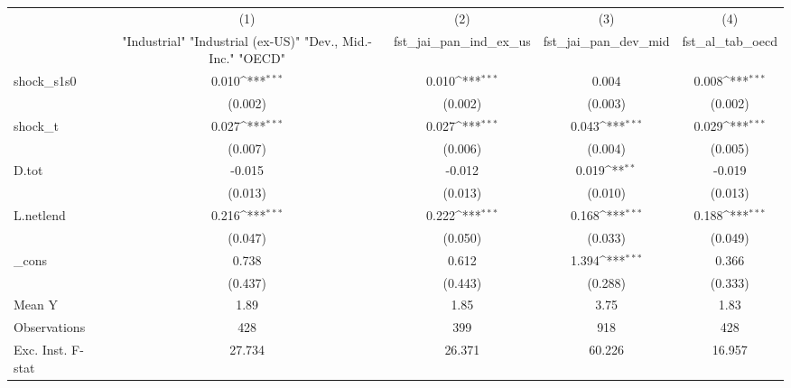 {
\def\sym#1{\ifmmode^{#1}\else\(^{#1}\)\fi}
\begin{tabular}{l*{4}{c}}
\toprule
            &\multicolumn{1}{c}{(1)}&\multicolumn{1}{c}{(2)}&\multicolumn{1}{c}{(3)}&\multicolumn{1}{c}{(4)}\\
            &\multicolumn{1}{c}{ "Industrial" "Industrial (ex-US)" "Dev., Mid.-Inc." "OECD" }&\multicolumn{1}{c}{fst\_jai\_pan\_ind\_ex\_us}&\multicolumn{1}{c}{fst\_jai\_pan\_dev\_mid}&\multicolumn{1}{c}{fst\_al\_tab\_oecd}\\
\midrule
shock\_s1s0  &       0.010\sym{***}&       0.010\sym{***}&       0.004         &       0.008\sym{***}\\
            &     (0.002)         &     (0.002)         &     (0.003)         &     (0.002)         \\
\addlinespace
shock\_t     &       0.027\sym{***}&       0.027\sym{***}&       0.043\sym{***}&       0.029\sym{***}\\
            &     (0.007)         &     (0.006)         &     (0.004)         &     (0.005)         \\
\addlinespace
D.tot       &      -0.015         &      -0.012         &       0.019\sym{**} &      -0.019         \\
            &     (0.013)         &     (0.013)         &     (0.010)         &     (0.013)         \\
\addlinespace
L.netlend   &       0.216\sym{***}&       0.222\sym{***}&       0.168\sym{***}&       0.188\sym{***}\\
            &     (0.047)         &     (0.050)         &     (0.033)         &     (0.049)         \\
\addlinespace
\_cons      &       0.738         &       0.612         &       1.394\sym{***}&       0.366         \\
            &     (0.437)         &     (0.443)         &     (0.288)         &     (0.333)         \\
\midrule
Mean Y      &        1.89         &        1.85         &        3.75         &        1.83         \\
Observations&         428         &         399         &         918         &         428         \\
Exc. Inst. F-stat&      27.734         &      26.371         &      60.226         &      16.957         \\
\bottomrule
\end{tabular}
}
